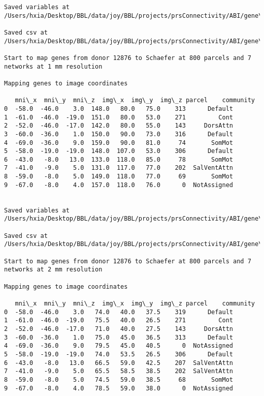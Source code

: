 \documentclass[11pt]{article}
\begin{document}
\begin{Verbatim}[commandchars=\\\{\}]
Saved variables at /Users/hxia/Desktop/BBL/data/joy/BBL/projects/prsConnectivity/ABI/gene\_mapping/12876donor\_600Parcels\_17Network\_2mm.pkl

Saved csv at /Users/hxia/Desktop/BBL/data/joy/BBL/projects/prsConnectivity/ABI/gene\_mapping/12876donor\_600Parcels\_17Network\_2mm.csv

Start to map genes from donor 12876 to Schaefer at 800 parcels and 7 networks at 1 mm resolution

Mapping genes to image coordinates

   mni\_x  mni\_y  mni\_z  img\_x  img\_y  img\_z parcel    community
0  -58.0  -46.0    3.0  148.0   80.0   75.0    313      Default
1  -61.0  -46.0  -19.0  151.0   80.0   53.0    271         Cont
2  -52.0  -46.0  -17.0  142.0   80.0   55.0    143     DorsAttn
3  -60.0  -36.0    1.0  150.0   90.0   73.0    316      Default
4  -69.0  -36.0    9.0  159.0   90.0   81.0     74       SomMot
5  -58.0  -19.0  -19.0  148.0  107.0   53.0    306      Default
6  -43.0   -8.0   13.0  133.0  118.0   85.0     78       SomMot
7  -41.0   -9.0    5.0  131.0  117.0   77.0    202  SalVentAttn
8  -59.0   -8.0    5.0  149.0  118.0   77.0     69       SomMot
9  -67.0   -8.0    4.0  157.0  118.0   76.0      0  NotAssigned


Saved variables at /Users/hxia/Desktop/BBL/data/joy/BBL/projects/prsConnectivity/ABI/gene\_mapping/12876donor\_800Parcels\_7Network\_1mm.pkl

Saved csv at /Users/hxia/Desktop/BBL/data/joy/BBL/projects/prsConnectivity/ABI/gene\_mapping/12876donor\_800Parcels\_7Network\_1mm.csv

Start to map genes from donor 12876 to Schaefer at 800 parcels and 7 networks at 2 mm resolution

Mapping genes to image coordinates

   mni\_x  mni\_y  mni\_z  img\_x  img\_y  img\_z parcel    community
0  -58.0  -46.0    3.0   74.0   40.0   37.5    319      Default
1  -61.0  -46.0  -19.0   75.5   40.0   26.5    271         Cont
2  -52.0  -46.0  -17.0   71.0   40.0   27.5    143     DorsAttn
3  -60.0  -36.0    1.0   75.0   45.0   36.5    313      Default
4  -69.0  -36.0    9.0   79.5   45.0   40.5      0  NotAssigned
5  -58.0  -19.0  -19.0   74.0   53.5   26.5    306      Default
6  -43.0   -8.0   13.0   66.5   59.0   42.5    207  SalVentAttn
7  -41.0   -9.0    5.0   65.5   58.5   38.5    202  SalVentAttn
8  -59.0   -8.0    5.0   74.5   59.0   38.5     68       SomMot
9  -67.0   -8.0    4.0   78.5   59.0   38.0      0  NotAssigned



\end{Verbatim}
\end{document}

